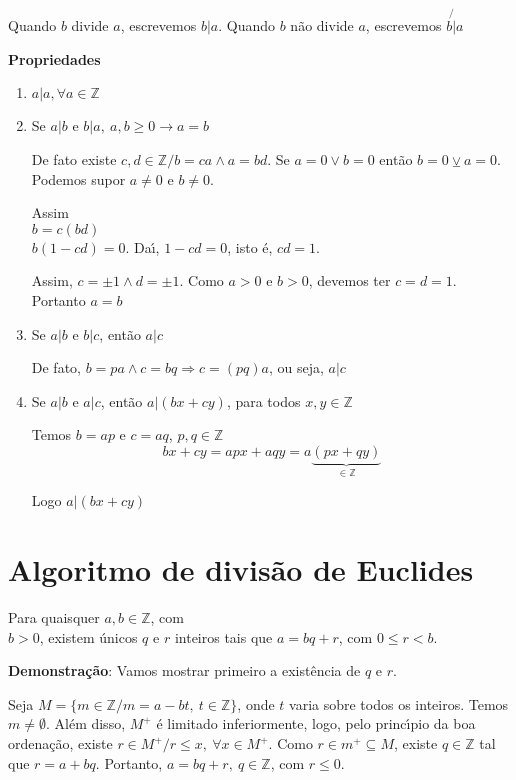 \begin{nota}[Divis{\~a}o] Quando $b$ divide $a$, escrevemos $b|a$. Quando $b$ n{\~a}o divide $a$, escrevemos $b\not{|}a$\end{nota}

\textbf{Propriedades}
\begin{enumerate}
\item $a|a, \forall a\in\mathbb{Z}$
\item Se $a|b$ e $b|a,\ a,b\geq 0\rightarrow a=b$

De fato existe $c,d\in\mathbb{Z}/b=ca\wedge a=bd$. Se $a=0\vee b=0$ ent{\~a}o $b=0\veebar a=0$. Podemos supor $a\neq 0$ e $b\neq 0$.

Assim\\
$b=c(bd)$\\
$b(1-cd)=0$. Da{\'\i}, $1-cd=0$, isto {\'e}, $cd=1$.

Assim, $c=\pm 1\wedge d=\pm 1$. Como $a>0$ e $b>0$, devemos ter $c=d=1$. Portanto $a=b$
\item Se $a|b$ e $b|c$, ent{\~a}o $a|c$

De fato, $b=pa\wedge c=bq \Rightarrow c=(pq)a$, ou seja, $a|c$
\item Se $a|b$ e $a|c$, ent{\~a}o $a|(bx+cy)$, para todos $x,y\in\mathbb{Z}$

Temos $b=ap$ e $c=aq$, $p,q\in\mathbb{Z}$
\[bx+cy=apx+aqy=a\underbrace{(px+qy)}_{\in\mathbb{Z}}\]

Logo $a|(bx+cy)$
\end{enumerate}

\section{Algoritmo de divis{\~a}o de Euclides}

\begin{teorema} Para quaisquer $a,b\in\mathbb{Z}$, com\\ $b>0$, existem {\'u}nicos $q$ e $r$ inteiros tais que $a=bq+r$, com $0\leq r<b$.\end{teorema}

\textbf{Demonstra{\c c}{\~a}o}: Vamos mostrar primeiro a exist{\^e}ncia de $q$ e $r$.

Seja $M=\{m\in\mathbb{Z}/m=a-bt,\ t\in\mathbb{Z}\}$, onde $t$ varia sobre todos os inteiros. Temos $m\neq\emptyset$. Al{\'e}m disso, $M^{+}$ {\'e} limitado inferiormente, logo, pelo princ{\'\i}pio da boa ordena{\c c}{\~a}o, existe $r\in M^{+}/r\leq x,\ \forall x\in M^{+}$. Como $r\in m^{+}\subseteq M$, existe $q\in\mathbb{Z}$ tal que $r=a+bq$. Portanto, $a=bq+r,\ q\in\mathbb{Z}$, com $r\leq 0$.

